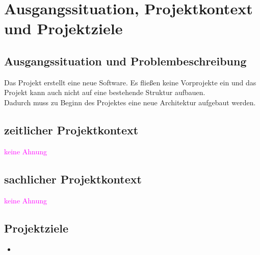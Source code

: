 
\chapter{Ausgangssituation, Projektkontext und Projektziele}
\section{Ausgangssituation und Problembeschreibung}
Das Projekt erstellt eine neue Software. Es fließen keine Vorprojekte ein und das Projekt kann auch nicht auf eine bestehende Struktur aufbauen. \\
Dadurch muss zu Beginn des Projektes eine neue Architektur aufgebaut werden. \\

\section{zeitlicher Projektkontext}
\textcolor{magenta}{keine Ahnung}

\section{sachlicher Projektkontext}
\textcolor{magenta}{keine Ahnung}

\section{Projektziele}
\begin{itemize}
\item 

\end{itemize}

